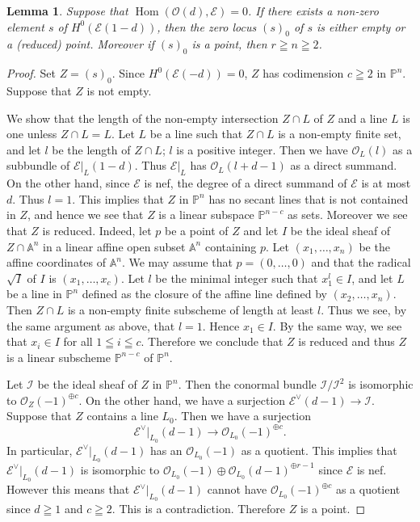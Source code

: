 \documentclass[a4paper,12pt]{amsart}
\newtheorem{lemma}[thm]{Lemma}%
\DeclareMathOperator{\Hom}{Hom}
\begin{document}
\begin{lemma}\label{s0linear}
Suppose that 
$\Hom(\mathcal{O}(d),\mathcal{E})=0$.
If there exists a non-zero element $s$ of 
$H^0(\mathcal{E}(1-d))$,
then 
the zero locus $(s)_0$ of $s$ is 
either empty or a (reduced) point.
Moreover if $(s)_0$ is a point, then $r\geqq n\geqq 2$.
\end{lemma}
\begin{proof}
Set $Z=(s)_0$.
Since $H^0(\mathcal{E}(-d))=0$, 
$Z$ has codimension $c\geqq 2$ in $\mathbb{P}^n$.
Suppose that 
$Z$
is not empty.

We show that the length of the non-empty intersection 
$Z\cap L$
of 
$Z$
and a line $L$ is one unless 
$Z\cap L=L$.
Let $L$ be a line such that 
$Z\cap L$
is a non-empty finite set,
and let $l$ be the length of 
$Z\cap L$;
$l$ is a positive integer. Then we have $\mathcal{O}_L(l)$ as a subbundle of $\mathcal{E}|_L(1-d)$.
Thus $\mathcal{E}|_L$ has $\mathcal{O}_L(l+d-1)$ as a direct summand. On the other hand,
since $\mathcal{E}$ is nef, the degree of a direct summand of $\mathcal{E}$ is at most $d$.
Thus $l=1$.
This implies that
$Z$
in $\mathbb{P}^n$ has no secant lines that is not contained in 
$Z$,
and hence we see that 
$Z$
is a linear subspace $\mathbb{P}^{n-c}$
as sets.
Moreover we see that 
$Z$
is reduced.
Indeed, let $p$ be a point of 
$Z$
and let $I$ be the ideal sheaf of 
$Z\cap \mathbb{A}^n$
in a linear affine open subset $\mathbb{A}^n$ containing $p$.
Let $(x_1,\dots,x_n)$ be the affine coordinates of $\mathbb{A}^n$.
We may assume that $p=(0,\dots,0)$ and that the radical $\sqrt{I}$ of $I$ is $(x_1,\dots,x_c)$.
Let $l$ be the minimal integer such that $x_1^l\in I$,
and let $L$ be a line in $\mathbb{P}^n$ defined as the closure of the affine line
defined by $(x_2,\dots, x_n)$.
Then 
$Z\cap L$
is a non-empty finite subscheme of length at least $l$.
Thus we see, by the same argument as above, that $l=1$.
Hence $x_1\in I$. By the same way, we see that $x_i\in I$ for all $1\leqq i\leqq c$.
Therefore we conclude that 
$Z$ is reduced and thus 
$Z$
is a linear subscheme $\mathbb{P}^{n-c}$
of $\mathbb{P}^n$.

Let $\mathcal{I}$ be the ideal sheaf of 
$Z$
in $\mathbb{P}^n$. Then the conormal bundle
$\mathcal{I}/\mathcal{I}^2$ is isomorphic to $\mathcal{O}_{Z}(-1)^{\oplus c}$.
On the other hand, we have a surjection $\mathcal{E}^{\vee}(d-1)\to \mathcal{I}$.
Suppose that $Z$ contains a line $L_0$. Then we have a surjection
\[\mathcal{E}^{\vee}|_{L_0}(d-1)\to \mathcal{O}_{L_0}(-1)^{\oplus c}.
\]
In particular, $\mathcal{E}^{\vee}|_{L_0}(d-1)$ has an $\mathcal{O}_{L_0}(-1)$ as a quotient.
This implies that $\mathcal{E}^{\vee}|_{L_0}(d-1)$ is isomorphic to 
$\mathcal{O}_{L_0}(-1)\oplus \mathcal{O}_{L_0}(d-1)^{\oplus r-1}$
since $\mathcal{E}$ is nef.
However this means that $\mathcal{E}^{\vee}|_{L_0}(d-1)$ cannot have $\mathcal{O}_{L_0}(-1)^{\oplus c}$
as a quotient since $d\geqq 1$ and $c\geqq 2$. This is a contradiction.
Therefore $Z$ is a point.
\end{proof}
\end{document}
